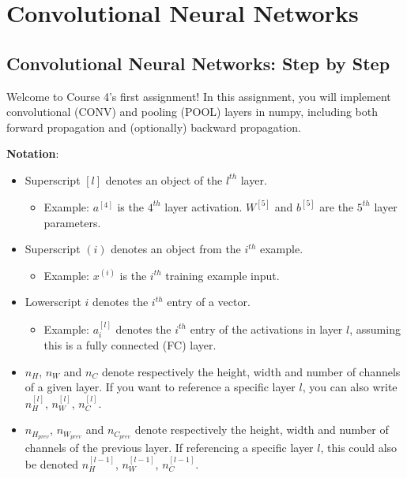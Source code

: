 \section{Convolutional Neural Networks}
\subsection{Convolutional Neural Networks: Step by Step}

Welcome to Course 4's first assignment! In this assignment, you will implement convolutional (CONV) and pooling (POOL) layers in numpy, including both forward propagation and (optionally) backward propagation.

{{\textbf {Notation}}:
\begin{itemize}
\item Superscript $[l]$ denotes an object of the $l^{th}$ layer. 
    \begin{itemize}
    \item Example: $a^{[4]}$ is the $4^{th}$ layer activation. $W^{[5]}$ and $b^{[5]}$ are the $5^{th}$ layer parameters.
    \end{itemize}

\item Superscript $(i)$ denotes an object from the $i^{th}$ example. 
   \begin{itemize}
    \item Example: $x^{(i)}$ is the $i^{th}$ training example input.
    \end{itemize}
    
\item Lowerscript $i$ denotes the $i^{th}$ entry of a vector.
    \begin{itemize}
    \item Example: $a^{[l]}_i$ denotes the $i^{th}$ entry of the activations in layer $l$, assuming this is a fully connected (FC) layer.
    \end{itemize}
    
\item $n_H$, $n_W$ and $n_C$ denote respectively the height, width and number of channels of a given layer. If you want to reference a specific layer $l$, you can also write $n_H^{[l]}$, $n_W^{[l]}$, $n_C^{[l]}$. 
\item $n_{H_{prev}}$, $n_{W_{prev}}$ and $n_{C_{prev}}$ denote respectively the height, width and number of channels of the previous layer. If referencing a specific layer $l$, this could also be denoted $n_H^{[l-1]}$, $n_W^{[l-1]}$, $n_C^{[l-1]}$. 
\end{itemize}

}
